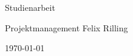 \documentclass{article}
\begin{document}
\begin{titlepage}
    \centering
    {\LARGE Studienarbeit}
    \par\vspace{1cm}
    Projektmanagement
    \vfill
    Felix Rilling
    \par\vspace{1cm}
    {\large \today\par}
\end{titlepage}

\tableofcontents
\newpage
\end{document}
